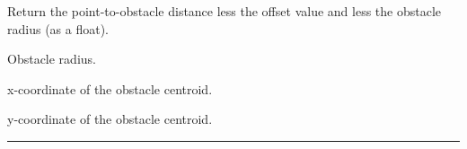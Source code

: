 \documentclass[letterpaper,10pt,english]{sphinxmanual}
\begin{document}
\begin{fulllineitems}
\begin{fulllineitems}
\label{Multi-robot motion planner:planning_sim.RoundObstacle.pt_2_obst}
Return the point-to-obstacle distance less the offset value
and less the obstacle radius (as a float).

\end{fulllineitems}


\begin{fulllineitems}
\label{Multi-robot motion planner:planning_sim.RoundObstacle.radius}
Obstacle radius.

\end{fulllineitems}


\begin{fulllineitems}
\label{Multi-robot motion planner:planning_sim.RoundObstacle.x}
x-coordinate of the obstacle centroid.

\end{fulllineitems}


\begin{fulllineitems}
\label{Multi-robot motion planner:planning_sim.RoundObstacle.y}
y-coordinate of the obstacle centroid.

\end{fulllineitems}


\end{fulllineitems}


\begin{DUlineblock}{0em}
\item[] 
\end{DUlineblock}


\bigskip\hrule{}\bigskip

\end{document}
